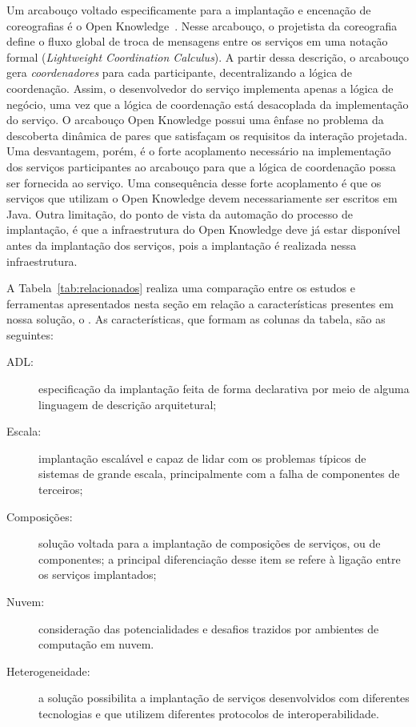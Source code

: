 Um arcabouço voltado especificamente para a implantação e encenação
de coreografias é o Open Knowledge~\cite{Besana2008OpenKnowledge,Siebes2007OK}.
Nesse arcabouço, o projetista da coreografia define o fluxo global
de troca de mensagens entre os serviços em uma notação formal
(\emph{Lightweight Coordination Calculus}).
A partir dessa descrição, o arcabouço gera \emph{coordenadores}
para cada participante, decentralizando a lógica de coordenação.
Assim, o desenvolvedor do serviço implementa apenas a lógica de negócio,
uma vez que a lógica de coordenação está desacoplada da implementação do serviço.
O arcabouço Open Knowledge possui uma ênfase no problema
da descoberta dinâmica de pares que satisfaçam os requisitos
da interação projetada. Uma desvantagem, porém,
é o forte acoplamento necessário na implementação dos serviços participantes
ao arcabouço para que a lógica de coordenação possa ser fornecida ao serviço.
Uma consequência desse forte acoplamento é que os serviços que
utilizam o Open Knowledge devem necessariamente ser escritos em Java.
Outra limitação, do ponto de vista da automação do processo de implantação,
é que a infraestrutura do Open Knowledge deve já estar disponível
antes da implantação dos serviços, pois a implantação é realizada nessa infraestrutura.

A Tabela~\ref{tab:relacionados} realiza uma comparação entre os estudos e ferramentas apresentados nesta seção em relação a características presentes em nossa solução, o \ee. 
As características, que formam as colunas da tabela, são as seguintes:

\begin{description}
\item [ADL:] especificação da implantação feita de forma declarativa por meio de alguma linguagem de descrição arquitetural;
\item [Escala:] implantação escalável e capaz de lidar com os problemas típicos de sistemas de grande escala, principalmente com a falha de componentes de terceiros;
\item [Composições:] solução voltada para a implantação de composições de serviços, ou de componentes; a principal diferenciação desse item se refere à ligação entre os serviços implantados;
\item [Nuvem:] consideração das potencialidades e desafios trazidos por ambientes de computação em nuvem.
\item [Heterogeneidade:] a solução possibilita a implantação de serviços desenvolvidos com diferentes tecnologias e que utilizem diferentes protocolos de interoperabilidade.
\end{description}

